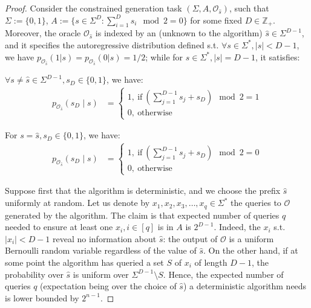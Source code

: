 \begin{proof}
    Consider the constrained generation task $(\Sigma, A, \mathcal{O}_{\hat{s}})$, such that $\Sigma := \{0,1\}$, $A := \{s \in \Sigma^D: \sum_{i=1}^{D} s_i \mod 2 = 0 \}$ for some fixed $D \in \mathbb{Z}_{+}$. Moreover, the oracle $\mathcal{O}_{\hat{s}}$ 
    is indexed by an (unknown to the algorithm) $\hat{s} \in \Sigma^{D-1}$, and it specifies the autoregressive distribution defined s.t.
    $\forall s \in \Sigma^*, |s| < D-1$, we have $p_{\mathcal{O}_{\hat{s}}}(1 | s) = p_{\mathcal{O}_{\hat{s}}}(0 | s) = 1/2$; while for $s \in \Sigma^*, |s| = D-1$, it satisfies:    
    
    $\forall s \neq \hat{s} \in \Sigma^{D-1},  s_D \in \{0,1\}$, we have:
    \begin{align}
    \label{eq:not_s_hat}
    p_{\mathcal{O}_{\hat{s}}}(s_D \mid s) &=
    \begin{cases}
        1, \ \text{if} \ \left( \sum_{j=1}^{D-1} s_j + s_D \right) \mod 2 = 1 \\
        0, \ \text{otherwise}
    \end{cases}
    \end{align}
    
    For $s = \hat{s},  s_D \in \{0,1\}$, we have:    
    \begin{align}
    \label{eq:is_s_hat}
    p_{\mathcal{O}_{\hat{s}}}(s_D \mid s) &= 
    \begin{cases}
        1, \ \text{if} \ \left( \sum_{j=1}^{D-1} s_j + s_D \right) \mod 2 = 0 \\
        0, \ \text{otherwise}
    \end{cases}
    \end{align}
    
     
    
    Suppose first that the algorithm is deterministic, and we choose the prefix $\hat{s}$ uniformly at random. Let us denote by $x_1, x_2, x_3, \dots, x_{q} \in \Sigma^*$ the queries to $\mathcal{O}$ generated by the algorithm. The claim is that expected number of queries $q$ needed to ensure at least one $x_i, i \in [q]$ is in $A$ is $2^{D-1}$. Indeed, the $x_i$ s.t. $|x_i| < D-1$ reveal no information about $\hat{s}$: the output of $\mathcal{O}$ is a uniform Bernoulli random variable regardless of the value of $\hat{s}$. On the other hand, if at some point the algorithm has queried a set $S$ of $x_i$ of length $D-1$, the probability over $\hat{s}$ is uniform over $\Sigma^{D-1} \setminus S$.  Hence, the expected number of queries $q$ (expectation being over the choice of $\hat{s}$) a deterministic algorithm needs is lower bounded by $2^{n-1}$. 


\end{proof}
